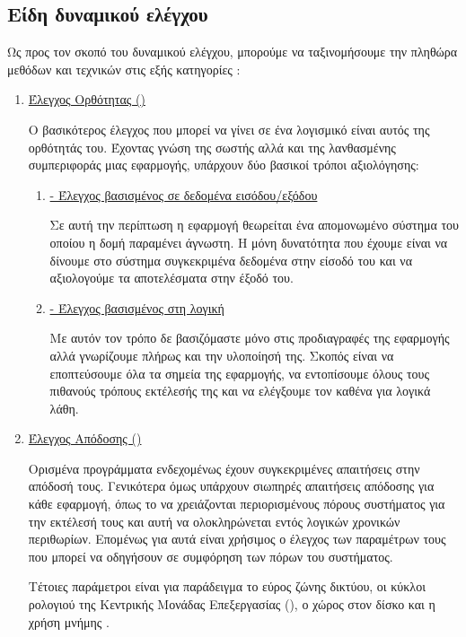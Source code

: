 \subsection{Είδη δυναμικού ελέγχου}
Ως προς τον σκοπό του δυναμικού ελέγχου, μπορούμε να ταξινομήσουμε την πληθώρα μεθόδων και τεχνικών στις εξής κατηγορίες \cite{pan1999software}:
\begin{enumerate}
    \item \underline{Έλεγχος Ορθότητας ()}
    
    Ο βασικότερος έλεγχος που μπορεί να γίνει σε ένα λογισμικό
    είναι αυτός της ορθότητάς του.
    Έχοντας γνώση της σωστής αλλά και της λανθασμένης συμπεριφοράς μιας εφαρμογής, 
    υπάρχουν δύο βασικοί τρόποι αξιολόγησης: 
    \begin{enumerate}
        \item \underline{ - Έλεγχος βασισμένος σε δεδομένα εισόδου/εξόδου}
        
        Σε αυτή την περίπτωση η εφαρμογή θεωρείται ένα απομονωμένο σύστημα
        του οποίου η δομή παραμένει άγνωστη.
        Η μόνη δυνατότητα που έχουμε είναι να δίνουμε στο σύστημα συγκεκριμένα δεδομένα στην είσοδό του
        και να αξιολογούμε τα αποτελέσματα στην έξοδό του.

        \item \underline{ - Έλεγχος βασισμένος στη λογική}
        
        Με αυτόν τον τρόπο δε βασιζόμαστε μόνο στις προδιαγραφές της εφαρμογής αλλά γνωρίζουμε πλήρως και την υλοποίησή της.
        Σκοπός είναι να εποπτεύσουμε όλα τα σημεία της εφαρμογής,
        να εντοπίσουμε όλους τους πιθανούς τρόπους εκτέλεσής της 
        και να ελέγξουμε τον καθένα για λογικά λάθη.
    \end{enumerate}

    \item \underline{Έλεγχος Απόδοσης ()}
    
    Ορισμένα προγράμματα ενδεχομένως έχουν συγκεκριμένες απαιτήσεις στην απόδοσή τους.
    Γενικότερα όμως υπάρχουν σιωπηρές απαιτήσεις απόδοσης για κάθε εφαρμογή,
    όπως το να χρειάζονται περιορισμένους πόρους συστήματος για την εκτέλεσή τους και αυτή να ολοκληρώνεται εντός λογικών χρονικών περιθωρίων.
    Επομένως για αυτά είναι χρήσιμος ο έλεγχος των παραμέτρων τους που μπορεί να οδηγήσουν σε συμφόρηση των πόρων του συστήματος.

    Τέτοιες παράμετροι είναι για παράδειγμα το εύρος ζώνης δικτύου, οι κύκλοι ρολογιού της Κεντρικής Μονάδας Επεξεργασίας (),
    ο χώρος στον δίσκο και η χρήση μνήμης \cite{smith1990performance}.


\end{enumerate}

